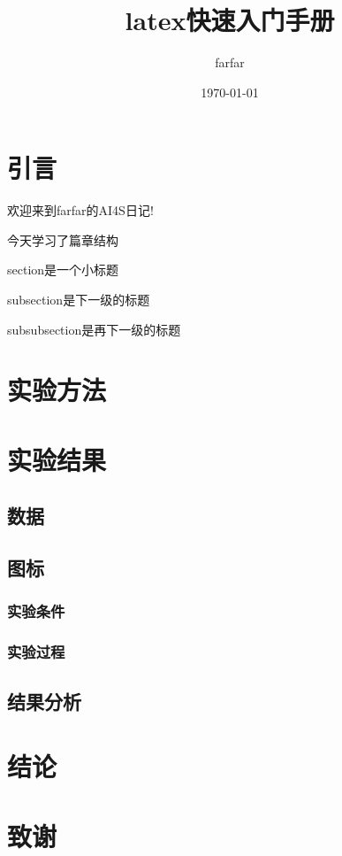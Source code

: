 \documentclass[UTF8]{article}%
\title{\heiti latex快速入门手册}
\author{\kaishu farfar }
\date{\today}
\begin{document}
 \maketitle%
\section{引言}
欢迎来到farfar的AI4S日记!

今天学习了篇章结构

section是一个小标题

subsection是下一级的标题

subsubsection是再下一级的标题

\section{实验方法}
 \section{实验结果}
 \subsection{数据}
 \subsection{图标}
 \subsubsection{实验条件}
 \subsubsection{实验过程}
 \subsection{结果分析}
 \section{结论}
 \section{致谢}
 
\end{document}

